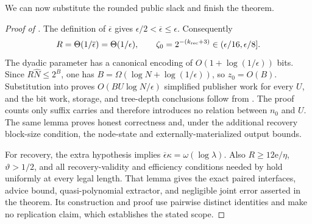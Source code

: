 \documentclass[11pt]{article}
\begin{document}
We can now substitute the rounded public slack and finish the theorem.

\begin{proof}[Proof of ]
The definition of $\overline\epsilon$ gives
$\epsilon/2<\overline\epsilon\le\epsilon$.  Consequently
\[
 R=\Theta(1/\overline\epsilon)=\Theta(1/\epsilon),
 \qquad
 \zeta_0=2^{-(k_{\rm rec}+3)}\in(\epsilon/16,\epsilon/8].
\]
The dyadic parameter has a canonical encoding of
$O(1+\log(1/\epsilon))$ bits.  Since
$R\widehat N\le2^B$, one has $B=\Omega(\log N+\log(1/\epsilon))$, so
$z_0=O(B)$.  Substitution into  proves
$O(BU\log N/\epsilon)$ simplified publisher work for every $U$, and the bit
work, storage, and tree-depth conclusions follow from .
The proof counts only suffix carries and therefore introduces no relation
between $n_0$ and $U$.  The same lemma proves honest correctness and, under
the additional recovery block-size condition, the node-state and
externally-materialized output bounds.

For recovery, the extra hypothesis implies
$\overline\epsilon\kappa=\omega(\log\lambda)$.  Also
$R\ge12\mathrm e/\eta$, $\vartheta>1/2$, and all recovery-validity and
efficiency conditions needed by  hold uniformly at every
legal length.  That lemma gives the exact paired interfaces, advice bound,
quasi-polynomial extractor, and negligible joint error asserted in the
theorem.  Its construction and proof use pairwise distinct identities and make
no replication claim, which establishes the stated scope.
\end{proof}



\end{document}
